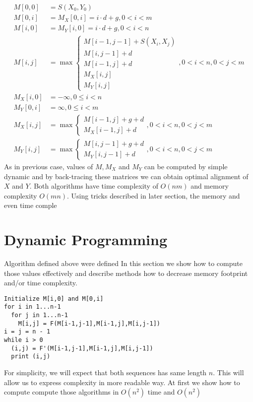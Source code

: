 \begin{align}
M[0,0] &= S(X_0,Y_0)\\
M[0,i] &= M_X[0,i] = i\cdot d+g, 0 < i < m\\
M[i,0] &= M_Y[i,0] = i\cdot d+g, 0 < i < n\\
M[i,j] &= \max
\begin{cases}
 M[i-1,j-1]+S(X_i,X_j)\\
 M[i,j-1]+d\\
 M[i-1,j]+d\\
 M_X[i,j]\\
 M_Y[i,j]
\end{cases}, 0<i<n,0<j<m\\
M_X[i,0] &= -\infty, 0\leq i< n\\
M_Y[0,i] &= \infty, 0 \leq i< m\\
M_X[i,j] &= \max
\begin{cases}
M[i-1,j]+g+d\\
M_X[i-1,j]+d
\end{cases}, 0<i<n,0<j<m\\
M_Y[i,j] &= \max
\begin{cases}
M[i,j-1]+g+d\\
M_Y[i,j-1]+d
\end{cases}, 0<i<n,0<j<m
\end{align}
As in previous case, values of $M,M_X$ and $M_Y$ can be computed by simple
dynamic and by back-tracing these matrices we can obtain optimal alignment of
$X$ and $Y$.
Both algorithms have time complexity of $O(nm)$ and memory complexity $O(mn)$.
Using tricks described in later section, the memory and even time comple

\section{Dynamic Programming}

Algorithm defined above were defined In this section we show how to compute
those values effectively and describe 
methods how to decrease memory footprint and/or time complexity.

\begin{lstlisting}
Initialize M[i,0] and M[0,i]
for i in 1...n-1
  for j in 1...n-1
    M[i,j] = F(M[i-1,j-1],M[i-1,j],M[i,j-1])
i = j = n - 1
while i > 0
  (i,j) = F'(M[i-1,j-1],M[i-1,j],M[i,j-1])
  print (i,j)
\end{lstlisting}

For simplicity, we will expect that both sequences has same length $n$. This
will allow us to express complexity in more readable way.  At first we show how
to compute compute those algorithms in $O(n^2)$ time and $O(n^2)$ 

